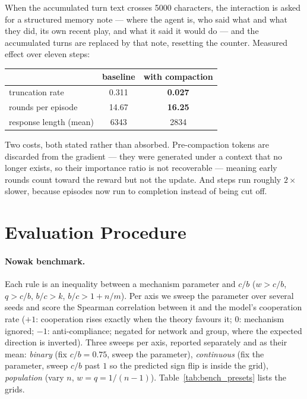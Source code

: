 \documentclass{article}
\begin{document}
When the accumulated turn text crosses 5000 characters, the interaction is
asked for a structured memory note --- where the agent is, who said what and
what they did, its own recent play, and what it said it would do --- and the
accumulated turns are replaced by that note, resetting the counter. Measured
effect over eleven steps:

\begin{center}
\begin{tabular}{@{}lcc@{}}
\toprule
& baseline & with compaction \\ \midrule
truncation rate      & 0.311 & \textbf{0.027} \\
rounds per episode   & 14.67 & \textbf{16.25} \\
response length (mean) & 6343 & 2834 \\ \bottomrule
\end{tabular}
\end{center}

Two costs, both stated rather than absorbed. Pre-compaction tokens are
discarded from the gradient --- they were generated under a context that no
longer exists, so their importance ratio is not recoverable --- meaning early
rounds count toward the reward but not the update. And steps run roughly
$2\times$ slower, because episodes now run to completion instead of being cut
off.

\section{Evaluation Procedure}
\label{app:evaluation}

\paragraph{Nowak benchmark.} Each rule is an inequality between a mechanism
parameter and $c/b$ ($w>c/b$, $q>c/b$, $b/c>k$, $b/c>1+n/m$). Per axis we
sweep the parameter over several seeds and score the Spearman correlation
between it and the model's cooperation rate ($+1$: cooperation rises
exactly when the theory favours it; $0$: mechanism ignored; $-1$:
anti-compliance; negated for network and group, where the expected
direction is inverted). Three sweeps per axis, reported separately and as
their mean: \emph{binary} (fix $c/b=0.75$, sweep the parameter),
\emph{continuous} (fix the parameter, sweep $c/b$ past $1$ so the
predicted sign flip is inside the grid), \emph{population} (vary $n$,
$w=q=1/(n-1)$). Table~\ref{tab:bench_presets} lists the grids.
\end{document}

